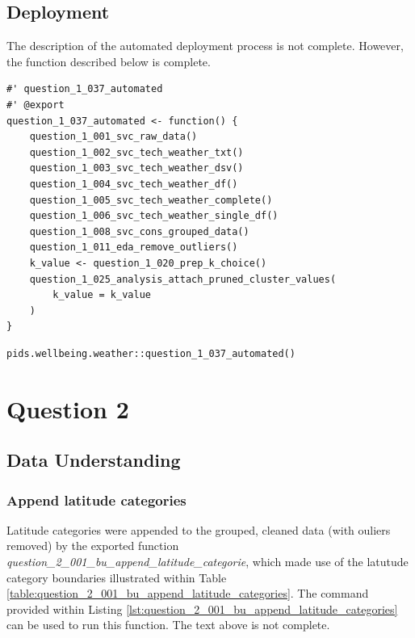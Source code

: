 \documentclass[12pt, oneside, openany]{book}
\begin{document}
\section*{Deployment}
\color{red}The description of the automated deployment process is not complete. However, the function described below is complete.\color{black}
\begin{lstlisting}
#' question_1_037_automated
#' @export
question_1_037_automated <- function() {
	question_1_001_svc_raw_data()
	question_1_002_svc_tech_weather_txt()
	question_1_003_svc_tech_weather_dsv()
	question_1_004_svc_tech_weather_df()
	question_1_005_svc_tech_weather_complete()
	question_1_006_svc_tech_weather_single_df()
	question_1_008_svc_cons_grouped_data()
	question_1_011_eda_remove_outliers()
	k_value <- question_1_020_prep_k_choice()
	question_1_025_analysis_attach_pruned_cluster_values(
		k_value = k_value
	)
}
\end{lstlisting}

\bigskip
\begin{lstlisting}
pids.wellbeing.weather::question_1_037_automated()
\end{lstlisting}

\setcounter{equation}{0}
\chapter*{Question 2}

\section*{Data Understanding}

\subsection*{Append latitude categories}

Latitude categories were appended to the grouped, cleaned data (with ouliers removed) by the exported function \emph{question\_2\_001\_bu\_append\_latitude\_categorie}, which made use of the latutude category boundaries illustrated within Table \ref{table:question_2_001_bu_append_latitude_categories}. The command provided within Listing \ref{lst:question_2_001_bu_append_latitude_categories} can be used to run this function.
\color{red}The text above is not complete\color{black}.
\end{document}
